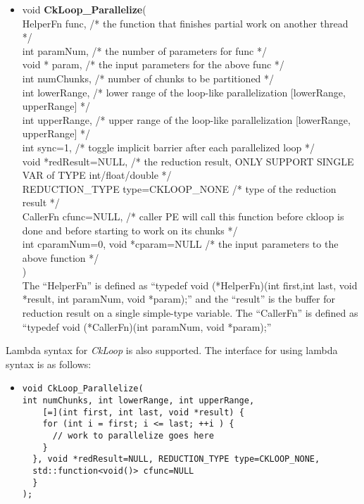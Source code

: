 \begin{itemize}
\item void \textbf{CkLoop\_Parallelize}( \\
HelperFn func, /* the function that finishes partial work on another thread */ \\
int paramNum, /* the number of parameters for func */\\
void * param, /* the input parameters for the above func */ \\
int numChunks, /* number of chunks to be partitioned */ \\
int lowerRange, /* lower range of the loop-like parallelization [lowerRange, upperRange] */ \\
int upperRange, /* upper range of the loop-like parallelization [lowerRange, upperRange] */ \\
int sync=1, /* toggle implicit barrier after each parallelized loop */ \\
void *redResult=NULL, /* the reduction result, ONLY SUPPORT SINGLE VAR of TYPE int/float/double */ \\
REDUCTION\_TYPE type=CKLOOP\_NONE /* type of the reduction result */ \\
CallerFn cfunc=NULL, /* caller PE will call this function before ckloop is done and before starting to work on its chunks */ \\
int cparamNum=0, void *cparam=NULL /* the input parameters to the above function */ \\
) \\
The ``HelperFn'' is defined as ``typedef void (*HelperFn)(int first,int last, void *result, int paramNum, void *param);''
and the ``result'' is the buffer for reduction result on a single simple-type variable.
The ``CallerFn'' is defined as ``typedef void (*CallerFn)(int paramNum, void *param);''
\end{itemize}

Lambda syntax for \emph{CkLoop} is also supported. The interface for
using lambda syntax is as follows:
\begin{itemize}
\item \begin{verbatim}
void CkLoop_Parallelize(
int numChunks, int lowerRange, int upperRange,
    [=](int first, int last, void *result) {
    for (int i = first; i <= last; ++i ) {
      // work to parallelize goes here
    }
  }, void *redResult=NULL, REDUCTION_TYPE type=CKLOOP_NONE,
  std::function<void()> cfunc=NULL
  }
);
\end{verbatim}
\end{itemize}

